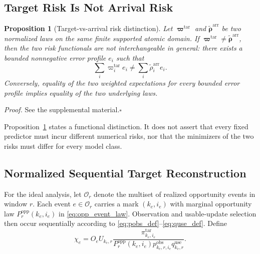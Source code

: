 \documentclass[letterpaper,journal]{IEEEtran}
\newtheorem{proposition}{Proposition}
\begin{document}
\subsection{Target Risk Is Not Arrival Risk}
\label{subsec:prop_risk}

\begin{proposition}[Target-vs-arrival risk distinction]
\label{prop:risk}
Let $\boldsymbol\varpi^{\mathrm{tar}}$ and
$\widetilde{\boldsymbol\rho}^{\mathrm{arr}}$ be two normalized laws on the same
finite supported atomic domain.  If
$\boldsymbol\varpi^{\mathrm{tar}}\neq\widetilde{\boldsymbol\rho}^{\mathrm{arr}}$,
then the two risk functionals are not interchangeable in general: there exists
a bounded nonnegative error profile $e_i$ such that
\begin{equation}
 \sum_i
 \varpi_i^{\mathrm{tar}}e_i
 \neq
 \sum_i
 \widetilde\rho_i^{\mathrm{arr}}e_i.
 \label{eq:prop1_nonidentity}
\end{equation}
Conversely, equality of the two weighted expectations for every bounded error
profile implies equality of the two underlying laws.
\end{proposition}

\noindent\emph{Proof.}
See the supplemental material.\hfill$\square$

Proposition~\ref{prop:risk} states a functional distinction.  It does not
assert that every fixed predictor must incur different numerical risks, nor
that the minimizers of the two risks must differ for every model class.

\subsection{Normalized Sequential Target Reconstruction}
\label{subsec:prop_reconstruction}

For the ideal analysis, let $\mathcal{O}_r$ denote the multiset of realized
opportunity events in window $r$.  Each event $e\in\mathcal{O}_r$ carries a
mark $(k_e,i_e)$ with marginal opportunity law
$P_r^{\mathrm{opp}}(k_e,i_e)$ in \eqref{eq:opp_event_law}.  Observation and
usable-update selection then occur sequentially according to
\eqref{eq:pobs_def}--\eqref{eq:quse_def}.  Define
\begin{equation}
 \chi_e
 =
 O_e U_{k_e,r}
 \frac{
 \pi^{\mathrm{tar}}_{k_e,i_e}
 }{
 P_r^{\mathrm{opp}}(k_e,i_e)
 p^{\mathrm{obs}}_{k_e,r,i_e}
 q^{\mathrm{use}}_{k_e,r}
 }.
 \label{eq:chi_event}
\end{equation}
\end{document}
